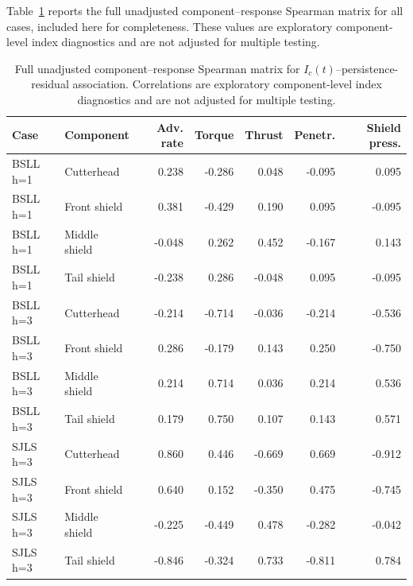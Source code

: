 Table~\ref{tab:descriptor_residual} reports the full unadjusted
component--response Spearman matrix for all cases, included here for
completeness. These values are exploratory component-level index diagnostics and are
not adjusted for multiple testing.

\begin{table}[htbp]
\centering
\caption{Full unadjusted component--response Spearman matrix for
$I_c(t)$--persistence-residual association. Correlations are exploratory
component-level index diagnostics and are not adjusted for multiple testing.}
\label{tab:descriptor_residual}
\scriptsize
\setlength{\tabcolsep}{3pt}
\begin{tabular}{llrrrrr}
\toprule
Case & Component & Adv. rate & Torque & Thrust & Penetr. & Shield press. \\
\midrule
BSLL h=1 & Cutterhead & 0.238 & -0.286 & 0.048 & -0.095 & 0.095 \\
BSLL h=1 & Front shield & 0.381 & -0.429 & 0.190 & 0.095 & -0.095 \\
BSLL h=1 & Middle shield & -0.048 & 0.262 & 0.452 & -0.167 & 0.143 \\
BSLL h=1 & Tail shield & -0.238 & 0.286 & -0.048 & 0.095 & -0.095 \\
BSLL h=3 & Cutterhead & -0.214 & -0.714 & -0.036 & -0.214 & -0.536 \\
BSLL h=3 & Front shield & 0.286 & -0.179 & 0.143 & 0.250 & -0.750 \\
BSLL h=3 & Middle shield & 0.214 & 0.714 & 0.036 & 0.214 & 0.536 \\
BSLL h=3 & Tail shield & 0.179 & 0.750 & 0.107 & 0.143 & 0.571 \\
SJLS h=3 & Cutterhead & 0.860 & 0.446 & -0.669 & 0.669 & -0.912 \\
SJLS h=3 & Front shield & 0.640 & 0.152 & -0.350 & 0.475 & -0.745 \\
SJLS h=3 & Middle shield & -0.225 & -0.449 & 0.478 & -0.282 & -0.042 \\
SJLS h=3 & Tail shield & -0.846 & -0.324 & 0.733 & -0.811 & 0.784 \\
\bottomrule
\end{tabular}
\end{table}
